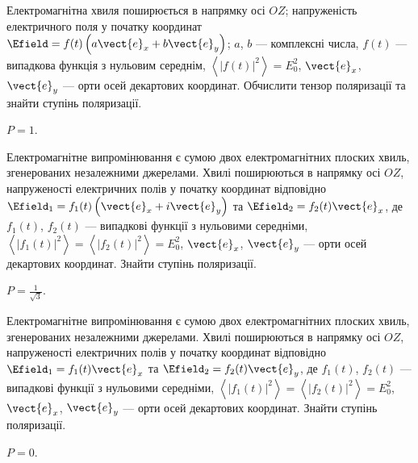 \begin{problem}%
    Електромагнітна хвиля поширюється в напрямку осі $OZ$; напруженість  електричного поля у початку координат  $\Efield = f(t)\left(a\vect{e}_x +
    b\vect{e}_y \right) $;  $a$, $b$ --- комплексні числа,  $f(t)$ --- випадкова функція з нульовим середнім,  $\left\langle |f(t)|^2\right\rangle =
    E_0^2$,  $\vect{e}_x$, $\vect{e}_y$ --- орти осей декартових координат. Обчислити тензор поляризації та знайти ступінь поляризації.
\begin{solution}
$P = 1$.
\end{solution}
\end{problem}


\begin{problem}%
Електромагнітне випромінювання є сумою двох електромагнітних  плоских хвиль, згенерованих незалежними джерелами. Хвилі поширюються в напрямку осі $OZ$,
напруженості електричних полів у початку координат відповідно $\Efield_1 = f_1(t)\left(\vect{e}_x + i
    \vect{e}_y \right) $  та $\Efield_2 = f_2(t) \vect{e}_x $, де  $f_1(t)$, $f_2(t)$  --- випадкові функції з нульовими середніми,  $\left\langle
    |f_1(t)|^2\right\rangle = \left\langle |f_2(t)|^2\right\rangle =
    E_0^2$, $\vect{e}_x$, $\vect{e}_y$ --- орти осей декартових координат. Знайти ступінь поляризації.
\begin{solution}
$P = \frac1{\sqrt{3}}$.
\end{solution}
\end{problem}


\begin{problem}%
   Електромагнітне випромінювання є сумою двох електромагнітних плоских хвиль, згенерованих незалежними джерелами. Хвилі поширюються в напрямку осі
   $OZ$,
   напруженості електричних полів у початку координат відповідно $\Efield_1 = f_1(t)\vect{e}_x $  та $\Efield_2 = f_2(t) \vect{e}_y $, де  $f_1(t)$,
   $f_2(t)$  --- випадкові функції з нульовими середніми,  $\left\langle
    |f_1(t)|^2\right\rangle = \left\langle |f_2(t)|^2\right\rangle =
    E_0^2$, $\vect{e}_x$, $\vect{e}_y$ --- орти осей декартових координат. Знайти ступінь поляризації.
\begin{solution}
$P = 0$.
\end{solution}
\end{problem}

